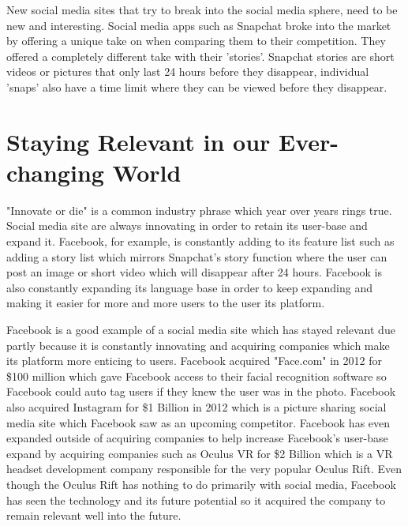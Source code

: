 New social media sites that try to break into the social media sphere, need to be new and interesting. Social media apps such as Snapchat broke into the market by offering a unique take on when comparing them to their competition. They offered a completely different take with their 'stories'. Snapchat stories are short videos or pictures that only last 24 hours before they disappear, individual 'snaps' also have a time limit where they can be viewed before they disappear.

\section{Staying Relevant in our Ever-changing World} 
"Innovate or die" is a common industry phrase which year over years rings true. Social media site are always innovating in order to retain its user-base and expand it. Facebook, for example, is constantly adding to its feature list such as adding a story list which mirrors Snapchat's story function where the user can post an image or short video which will disappear after 24 hours. Facebook is also constantly expanding its language base in order to keep expanding and making it easier for more and more users to the user its platform. 

Facebook is a good example of a social media site which has stayed relevant due partly because it is constantly innovating and acquiring companies which make its platform more enticing to users. Facebook acquired "Face.com" in 2012 for \$100 million which gave Facebook access to their facial recognition software so Facebook could auto tag users if they knew the user was in the photo. Facebook also acquired Instagram for \$1 Billion in 2012 which is a picture sharing social media site which Facebook saw as an upcoming competitor. Facebook has even expanded outside of acquiring companies to help increase Facebook's user-base expand by acquiring companies such as Oculus VR for \$2 Billion which is a VR headset development company responsible for the very popular Oculus Rift. Even though the Oculus Rift has nothing to do primarily with social media, Facebook has seen the technology and its future potential so it acquired the company to remain relevant well into the future.
